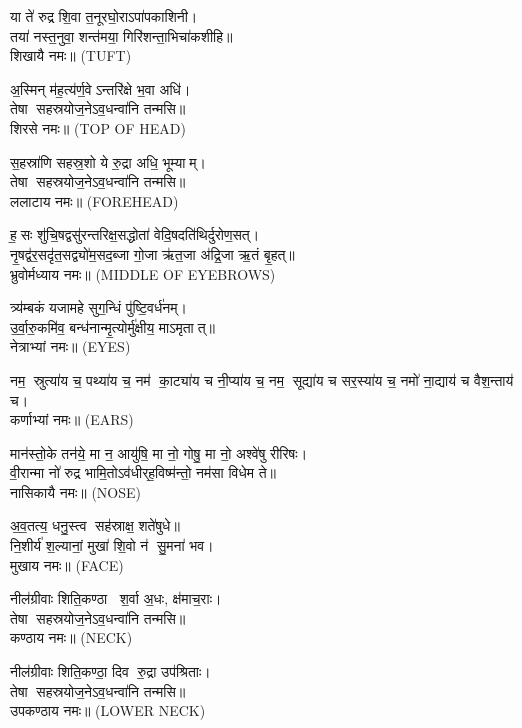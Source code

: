 
 या ते॑ रुद्र शि॒वा त॒नूरघो॒राऽपा॑पकाशिनी।\\
 तया॑ नस्त॒नुवा॒ शन्त॑मया॒ गिरि॑शन्ता॒भिचा॑कशीहि॥\\ शिखायै नमः॥ {\scriptsize (TUFT)}

अ॒स्मिन् म॑ह॒त्य॑र्ण॒वेऽन्तरि॑क्षे भ॒वा अधि॑।\\
 तेषा सहस्रयोज॒नेऽव॒धन्वा॑नि तन्मसि॥ \\
शिरसे नमः॥ {\scriptsize (TOP OF HEAD)}

स॒हस्रा॑णि सहस्र॒शो ये रु॒द्रा अधि॒ भूम्याम्।\\
 तेषा सहस्रयोज॒नेऽव॒धन्वा॑नि तन्मसि॥\\
ललाटाय नमः॥ {\scriptsize (FOREHEAD)}

ह॒सः शु॑चि॒षद्वसु॑रन्तरिक्ष॒सद्धोता॑ वेदि॒षदति॑थिर्दुरोण॒सत्।\\
नृ॒षद्व॑र॒सदृ॑त॒सद्व्यो॑म॒सद॒ब्जा गो॒जा ऋ॑त॒जा अ॑द्रि॒जा ऋ॒तं बृ॒हत्॥\\
भ्रुवोर्मध्याय नमः॥ {\scriptsize (MIDDLE OF EYEBROWS)}


त्र्य॑म्बकं यजामहे सुग॒न्धिं पु॑ष्टि॒वर्ध॑नम्।\\
 उ॒र्वा॒रु॒कमि॑व॒ बन्ध॑नान्मृ॒त्योर्मु॑क्षीय॒ माऽमृतात्॥\\
नेत्राभ्यां नमः॥ {\scriptsize (EYES)}

नम॒ स्रुत्या॑य च॒ पथ्या॑य च॒ नम॑ का॒ट्या॑य च नी॒प्या॑य च॒ %
 नम॒ सूद्या॑य च सर॒स्या॑य च॒ नमो॑ ना॒द्याय॑ च वैश॒न्ताय॑ च।\\
कर्णाभ्यां नमः॥ {\scriptsize (EARS)}

मान॑स्तो॒के तन॑ये॒ मा न॒ आयु॑षि॒ मा नो॒ गोषु॒ मा नो॒ अश्वे॑षु रीरिषः।\\
 वी॒रान्मा नो॑ रुद्र भामि॒तोऽव॑धीर्‌ह॒विष्म॑न्तो॒ नम॑सा विधेम ते॥ \\
नासिकायै नमः॥ {\scriptsize (NOSE)}

अ॒व॒तत्य॒ धनु॒स्त्व सह॑स्राक्ष॒ शते॑षुधे॥\\
 नि॒शीर्य॑ श॒ल्यानां॒ मुखा॑ शि॒वो न॑ सु॒मना॑ भव।\\
मुखाय नमः॥ {\scriptsize (FACE)}

 नील॑ग्रीवाः शिति॒कण्ठा श॒र्वा अ॒धः, क्ष॑माच॒राः।\\
 तेषा सहस्रयोज॒नेऽव॒धन्वा॑नि तन्मसि॥\\
कण्ठाय नमः॥ {\scriptsize (NECK)}

नील॑ग्रीवाः शिति॒कण्ठा॒ दिव रु॒द्रा उप॑श्रिताः।\\
 तेषा सहस्रयोज॒नेऽव॒धन्वा॑नि तन्मसि॥\\
उपकण्ठाय नमः॥ {\scriptsize (LOWER NECK)}

